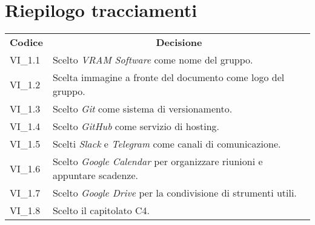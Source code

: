 % 
\section{Riepilogo tracciamenti}
\begin{longtable} {
		>{\centering}p{17mm} 
		>{}p{120mm}}
	\rowcolor{gray!50}
	\textbf{Codice} & \multicolumn{1}{c}{\textbf{Decisione}} \\%
	VI\_1.1 & Scelto \textit{VRAM Software} come nome del gruppo. \TBstrut \\ [2mm]
	VI\_1.2 & Scelta immagine a fronte del documento come logo del gruppo. \TBstrut \\ [2mm]
	VI\_1.3 & Scelto \textit{Git} come sistema di versionamento. \TBstrut \\ [2mm]
	VI\_1.4 & Scelto \textit{GitHub} come servizio di hosting. \TBstrut \\ [2mm]
	VI\_1.5 & Scelti \textit{Slack} e \textit{Telegram} come canali di comunicazione. \TBstrut \\ [2mm]
	VI\_1.6 & Scelto \textit{Google Calendar} per organizzare riunioni e appuntare scadenze. \TBstrut \\ [2mm]
	VI\_1.7 & Scelto \textit{Google Drive} per la condivisione di strumenti utili. \TBstrut \\ [2mm]
	VI\_1.8 & Scelto il capitolato C4. \TBstrut \\ [2mm]
\end{longtable}